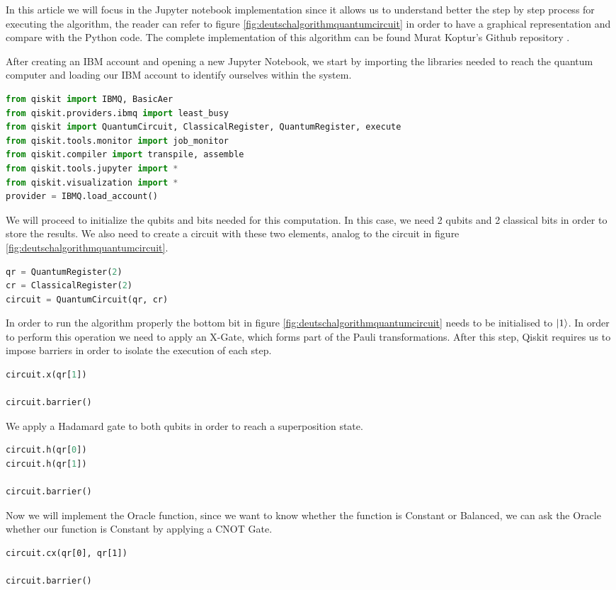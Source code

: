 \documentclass[12pt,a4paper]{scrartcl}
\begin{document}
In this article we will focus in the Jupyter notebook implementation since it allows us to understand better the step by step process for executing the algorithm, the reader can refer to figure \ref{fig:deutschalgorithmquantumcircuit} in order to have a graphical representation and compare with the Python code. The complete implementation of this algorithm can be found Murat Koptur's Github repository \cite{kopturgithub}.

After creating an IBM account and opening a new Jupyter Notebook, we start by importing the libraries needed to reach the quantum computer and loading our IBM account to identify ourselves within the system.

\begin{lstlisting}[language=python]
from qiskit import IBMQ, BasicAer
from qiskit.providers.ibmq import least_busy
from qiskit import QuantumCircuit, ClassicalRegister, QuantumRegister, execute
from qiskit.tools.monitor import job_monitor
from qiskit.compiler import transpile, assemble
from qiskit.tools.jupyter import *
from qiskit.visualization import *
provider = IBMQ.load_account()
\end{lstlisting}

We will proceed to initialize the qubits and bits needed for this computation. In this case, we need 2 qubits and 2 classical bits in order to store the results. We also need to create a circuit with these two elements, analog to the circuit in figure \ref{fig:deutschalgorithmquantumcircuit}.

\begin{lstlisting}[language=python]
qr = QuantumRegister(2)  
cr = ClassicalRegister(2) 
circuit = QuantumCircuit(qr, cr)
\end{lstlisting}

In order to run the algorithm properly the bottom bit in figure \ref{fig:deutschalgorithmquantumcircuit} needs to be initialised to $\ket{1}$. In order to perform this operation we need to apply an X-Gate, which forms part of the Pauli transformations. After this step, Qiskit requires us to impose barriers in order to isolate the execution of each step.

\begin{lstlisting}[language=python]
circuit.x(qr[1]) 

circuit.barrier()
\end{lstlisting}
We apply a Hadamard gate to both qubits in order to reach a superposition state.
\begin{lstlisting}[language=python]
circuit.h(qr[0])
circuit.h(qr[1])

circuit.barrier()
\end{lstlisting}
Now we will implement the Oracle function, since we want to know whether the function is Constant or Balanced, we can ask the Oracle whether our function is Constant by applying a CNOT Gate. 
\begin{lstlisting}
circuit.cx(qr[0], qr[1])

circuit.barrier()
\end{lstlisting}
\end{document}
